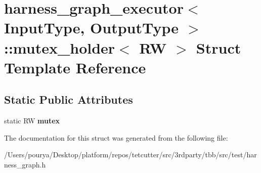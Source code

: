 \hypertarget{structharness__graph__executor_1_1mutex__holder}{}\section{harness\+\_\+graph\+\_\+executor$<$ Input\+Type, Output\+Type $>$\+:\+:mutex\+\_\+holder$<$ R\+W $>$ Struct Template Reference}
\label{structharness__graph__executor_1_1mutex__holder}
\subsection*{Static Public Attributes}
\begin{DoxyCompactItemize}
\item 
\hypertarget{structharness__graph__executor_1_1mutex__holder_a6fdb94fb76f451d873dda77ec2a8df21}{}static R\+W {\bfseries mutex}\label{structharness__graph__executor_1_1mutex__holder_a6fdb94fb76f451d873dda77ec2a8df21}

\end{DoxyCompactItemize}


The documentation for this struct was generated from the following file\+:\begin{DoxyCompactItemize}
\item 
/\+Users/pourya/\+Desktop/platform/repos/tetcutter/src/3rdparty/tbb/src/test/harness\+\_\+graph.\+h\end{DoxyCompactItemize}
